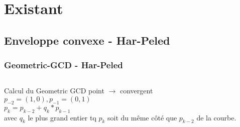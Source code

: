 \documentclass{beamer}
\begin{document}
\section{Existant}

\subsection{Enveloppe convexe - Har-Peled}
\begin{frame}
\frametitle{Geometric-GCD - Har-Peled}

\begin{columns}[t]
  \begin{column}{5cm}
    \begin{block}{Calcul du Geometric GCD}
      point $\rightarrow$ convergent\\
      $p_{-2} = (1,0), p_{-1} = (0,1)$\\
      $p_{k} = p_{k-2} + q_{k}*p_{k-1}$\\
      avec $q_{k}$ le plus grand entier tq $p_{k}$ soit du même côté que $p_{k-2}$ de la courbe.
      
    \end{block}
  \end{column}

  \begin{column}{5cm}
    

\end{column}
\end{columns}
\end{frame}
\end{document}
